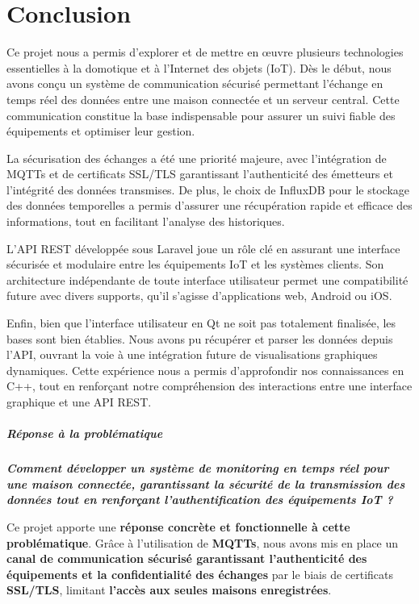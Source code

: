 \documentclass[10pt, a4paper]{report}
\begin{document}
	
	\chapter{Conclusion}
	Ce projet nous a permis d’explorer et de mettre en œuvre plusieurs technologies essentielles à la domotique et à l’Internet des objets (IoT). Dès le début, nous avons conçu un système de communication sécurisé permettant l’échange en temps réel des données entre une maison connectée et un serveur central. Cette communication constitue la base indispensable pour assurer un suivi fiable des équipements et optimiser leur gestion.
	
	La sécurisation des échanges a été une priorité majeure, avec l’intégration de MQTTs et de certificats SSL/TLS garantissant l’authenticité des émetteurs et l’intégrité des données transmises. De plus, le choix de InfluxDB pour le stockage des données temporelles a permis d’assurer une récupération rapide et efficace des informations, tout en facilitant l’analyse des historiques.
	
	L’API REST développée sous Laravel joue un rôle clé en assurant une interface sécurisée et modulaire entre les équipements IoT et les systèmes clients. Son architecture indépendante de toute interface utilisateur permet une compatibilité future avec divers supports, qu’il s’agisse d’applications web, Android ou iOS.
	
	Enfin, bien que l’interface utilisateur en Qt ne soit pas totalement finalisée, les bases sont bien établies. Nous avons pu récupérer et parser les données depuis l’API, ouvrant la voie à une intégration future de visualisations graphiques dynamiques. Cette expérience nous a permis d’approfondir nos connaissances en C++, tout en renforçant notre compréhension des interactions entre une interface graphique et une API REST.\\
	
	\paragraph{Réponse à la problématique}
	\textbf{\textit{Comment développer un système de monitoring en temps réel pour une maison connectée, garantissant la sécurité de la transmission des données tout en renforçant l'authentification des équipements IoT ?}}\vspace{1cm}
	
	Ce projet apporte une \textbf{réponse concrète et fonctionnelle à cette problématique}. Grâce à l’utilisation de \textbf{MQTTs}, nous avons mis en place un \textbf{canal de communication sécurisé garantissant l’authenticité des équipements et la confidentialité des échanges} par le biais de certificats \textbf{SSL/TLS}, limitant \textbf{l’accès aux seules maisons enregistrées}.
	
\end{document}
